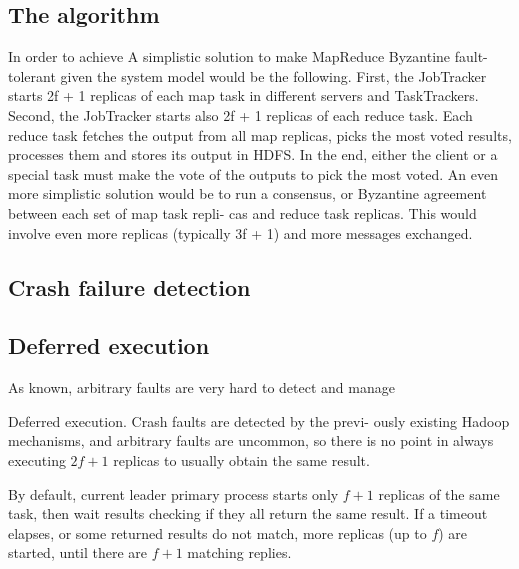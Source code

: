 \documentclass[sigchi]{acmart}
\begin{document}
 

\subsection{The algorithm}

In order to achieve 
A simplistic solution to make MapReduce
Byzantine fault-tolerant given the system model would be the
following. First, the JobTracker starts 2f + 1 replicas of each
map task in different servers and TaskTrackers. Second, the
JobTracker starts also 2f + 1 replicas of each reduce task.
Each reduce task fetches the output from all map replicas,
picks the most voted results, processes them and stores its
output in HDFS. In the end, either the client or a special task
must make the vote of the outputs to pick the most voted. An
even more simplistic solution would be to run a consensus,
or Byzantine agreement between each set of map task repli-
cas and reduce task replicas. This would involve even more
replicas (typically 3f + 1) and more messages exchanged.




\subsection{Crash failure detection}

\subsection{Deferred execution} As known, arbitrary faults are very hard to detect and manage 



Deferred execution. Crash faults are detected by the previ-
ously existing Hadoop mechanisms, and arbitrary faults are
uncommon, so there is no point in always executing $2f + 1$ replicas to usually obtain the same result.




By default, current leader primary process starts only $f + 1$ replicas of the same task, then wait results checking if they all return the same result. If a timeout elapses, or some returned results do not match, more replicas (up to $f$) are started, until there are $f + 1$ matching replies.
\end{document}
